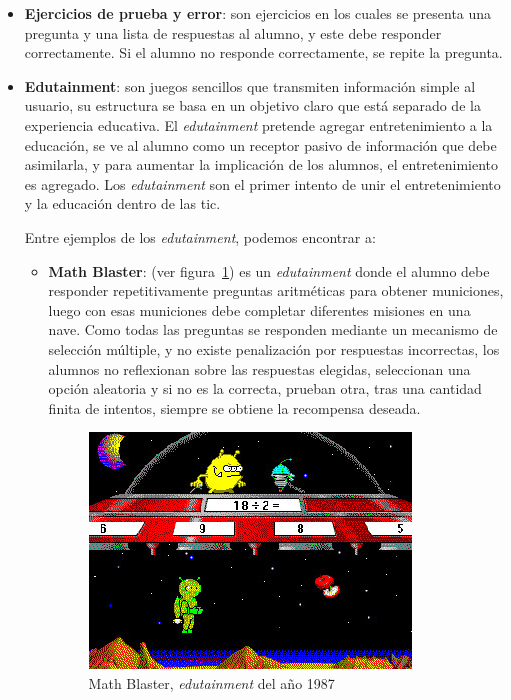 \begin{itemize}

\item \textbf{Ejercicios de prueba y error}: son ejercicios en los cuales se
    presenta una pregunta y una lista de respuestas al alumno, y este debe
    responder correctamente. Si el alumno no responde correctamente, se repite
    la pregunta\cite{weegar2012comparison}.

\item \textbf{Edutainment}: son juegos sencillos que transmiten información
    simple al usuario, su estructura se basa en un objetivo claro que está
    separado de la experiencia educativa\cite{egenfeldt2007third}. El
    \emph{edutainment} pretende agregar entretenimiento a la educación, se ve al
    alumno como un receptor pasivo de información que debe asimilarla, y para
    aumentar la implicación de los alumnos, el entretenimiento es
    agregado\cite{resnick:2004}. Los \emph{edutainment} son el primer intento de
    unir el entretenimiento y la educación dentro de las
    \gls{tic}\cite{leinonen:ict}.

    Entre ejemplos de los \emph{edutainment}, podemos encontrar a:

    \begin{itemize}

    \item \textbf{Math Blaster}: (ver figura~\ref{fig:math_blaster}) es un
        \emph{edutainment} donde el alumno debe responder repetitivamente
        preguntas aritméticas para obtener municiones, luego con esas municiones
        debe completar diferentes misiones en una nave\cite{bruckman1999can}.
        Como todas las preguntas se responden mediante un mecanismo de selección
        múltiple, y no existe penalización por respuestas incorrectas, los
        alumnos no reflexionan sobre las respuestas elegidas, seleccionan una
        opción aleatoria y si no es la correcta, prueban otra, tras una cantidad
        finita de intentos, siempre se obtiene la recompensa deseada.

        \begin{figure}[ht!] 
        \centering 
        \includegraphics[scale=0.5]{tics/images/math_blaster.jpg}
        \caption{Math Blaster, \emph{edutainment} del año 1987}\label{fig:math_blaster} 
        \end{figure}


\end{itemize}
\end{itemize}
